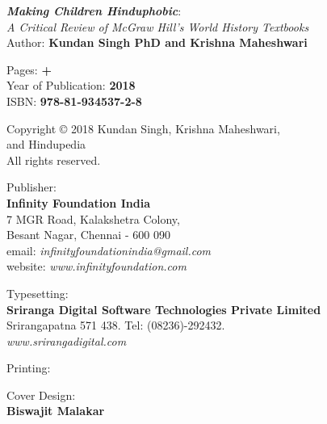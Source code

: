 \thispagestyle{empty}
\noindent
{\sl\bfseries Making Children Hinduphobic}:\\ 
{\sl A Critical Review of McGraw Hill’s World History Textbooks}\\[1pt] 
Author: {\bf Kundan Singh PhD and Krishna Maheshwari}\\[9pt]
\vfill

\noindent
Pages: {\bf \pageref{prelims} + \pageref{bookend}}\\
Year of Publication: {\bf 2018}\\
ISBN: {\bf 978-81-934537-2-8}
\vfill

\noindent
Copyright © 2018 Kundan Singh, Krishna Maheshwari,\\ and Hindupedia\\
All rights reserved.
\vfill



\noindent
Publisher:\\
\noindent
{\bf Infinity Foundation India}\\ 
7 MGR Road, Kalakshetra Colony,\\ 
Besant Nagar, Chennai - 600 090\\
email: {\sl infinityfoundationindia@gmail.com}\\
website: {\sl www.infinityfoundation.com} 
\vfill

\noindent
Typesetting:\\
{\bf Sriranga Digital Software Technologies Private Limited}\\ 
Srirangapatna 571 438. Tel: (08236)-292432.\\
{\sl www.srirangadigital.com}\\
\vfill

\noindent
Printing:\\
\vfill

\vfill
\noindent
Cover Design:\\
{\bf Biswajit Malakar}





